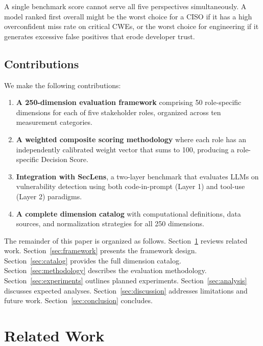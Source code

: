 \documentclass[10pt,twocolumn]{article}
\newcommand{\seclens}{SecLens\xspace}
\begin{document}
A single benchmark score cannot serve all five perspectives simultaneously. A model ranked first overall might be the worst choice for a CISO if it has a high overconfident miss rate on critical CWEs, or the worst choice for engineering if it generates excessive false positives that erode developer trust.

\subsection{Contributions}

We make the following contributions:

\begin{enumerate}[noitemsep,topsep=2pt]
    \item \textbf{A 250-dimension evaluation framework} comprising 50 role-specific dimensions for each of five stakeholder roles, organized across ten measurement categories.
    \item \textbf{A weighted composite scoring methodology} where each role has an independently calibrated weight vector that sums to 100, producing a role-specific Decision Score.
    \item \textbf{Integration with \seclens}, a two-layer benchmark that evaluates LLMs on vulnerability detection using both code-in-prompt (Layer 1) and tool-use (Layer 2) paradigms.
    \item \textbf{A complete dimension catalog} with computational definitions, data sources, and normalization strategies for all 250 dimensions.
\end{enumerate}

The remainder of this paper is organized as follows. Section~\ref{sec:related} reviews related work. Section~\ref{sec:framework} presents the framework design. Section~\ref{sec:catalog} provides the full dimension catalog. Section~\ref{sec:methodology} describes the evaluation methodology. Section~\ref{sec:experiments} outlines planned experiments. Section~\ref{sec:analysis} discusses expected analyses. Section~\ref{sec:discussion} addresses limitations and future work. Section~\ref{sec:conclusion} concludes.

\section{Related Work}
\label{sec:related}
\end{document}
